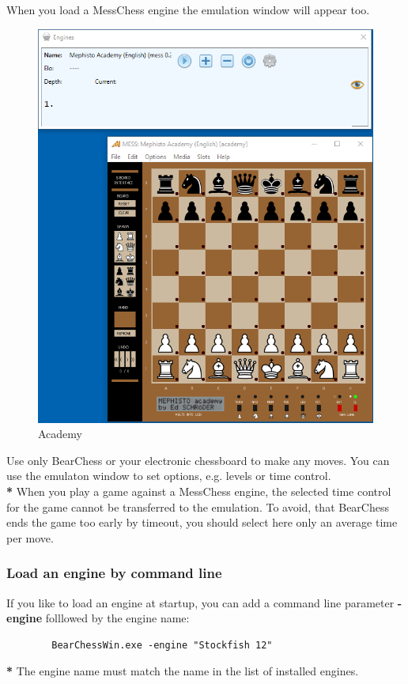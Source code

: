 \documentclass[11pt,a4paper]{article}
\begin{document}
	When you load a MessChess engine the emulation window will appear too.
	\begin{figure}[H]
		\centering
		\includegraphics[scale=0.7]{MessChess4.png}
		\caption{Academy}
		\label{fig:MessChess4}
	\end{figure}
	Use only BearChess or your electronic chessboard to make any moves. You can use the emulaton window to set options, e.g. levels or time control.\\
	{\color{red}\textbf{*}} When you play a game against a MessChess engine, the selected time control for the game cannot be transferred to the emulation. To avoid, that BearChess ends the game too early by timeout, you should select here only an average time per move.
	
	\subsubsection{Load an engine by command line}
	If you like to load an engine at startup, you can add a command line parameter \textbf{-engine} folllowed by the engine name:
	\begin{verbatim}
		BearChessWin.exe -engine "Stockfish 12"
	\end{verbatim}
	{\color{red}\textbf{*}} The engine name must match the name in the list of installed engines.
	
\end{document}
